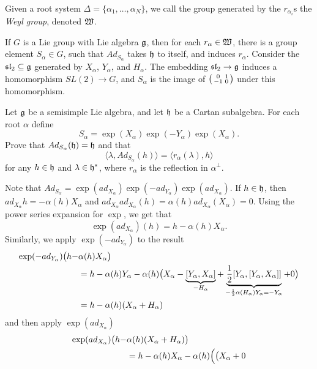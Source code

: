   Given a root system $\Delta =
 \{\alpha_1,\dots, \alpha_N\}$, we call the group generated by the $r_{\alpha_i}$s the
 \emph{Weyl group}, denoted $\mathfrak{W}$.

 \begin{remark}
   If $G$ is a Lie group with Lie algebra $\mathfrak{g}$, then for each $r_\alpha\in \mathfrak{W}$, there
   is a group element $S_\alpha\in G$, such that $Ad_{S_\alpha}$ takes $\mathfrak{h}$ to itself,
   and induces $r_\alpha$. Consider the $\mathfrak{sl}_2\subseteq \mathfrak{g}$ generated
   by $X_\alpha$, $Y_\alpha$, and $H_\alpha$. The embedding $\mathfrak{sl}_2\to \mathfrak{g}$ induces a
   homomorphism $SL(2)\to G$, and $S_\alpha$ is the image of $\left( \begin{smallmatrix} 0 & 1 \\ -1 & 0 \end{smallmatrix} \right)$ under
   this homomorphism.
 \end{remark}
 \begin{exercise}\label{lec14Ex:Weyl}
   Let $\mathfrak{g}$ be a semisimple Lie algebra, and let $\mathfrak{h}$ be a Cartan subalgebra. For each
   root $\alpha$ define
   \[
    S_\alpha = \exp(X_\alpha)\exp(-Y_\alpha)\exp(X_\alpha).
   \]
   Prove that $Ad_{S_\alpha}(\mathfrak{h})=\mathfrak{h}$ and that
   \[
    \langle \lambda, Ad_{S_\alpha}(h)\rangle = \langle r_\alpha(\lambda),h\rangle
   \]
   for any $h\in \mathfrak{h}$ and $\lambda\in \mathfrak{h}^*$, where $r_\alpha$ is the reflection in
   $\alpha^\perp$.
   \begin{solution} \label{lec14Soln:Weyl}
     Note that
     $Ad_{S_\alpha}=\exp(ad_{X_\alpha})\exp(-ad_{Y_\alpha})\exp(ad_{X_\alpha})$. If
     $h\in \mathfrak{h}$, then $ad_{X_\alpha}h=-\alpha(h)X_\alpha$ and
     $ad_{X_\alpha}ad_{X_\alpha}(h)=\alpha(h)ad_{X_\alpha}(X_\alpha)=0$. Using the
     power series expansion for $\exp$, we get that
     \[
       \exp(ad_{X_\alpha})(h)=h - \alpha(h)X_\alpha.
     \]
     Similarly, we apply $\exp(-ad_{Y_\alpha})$ to the result
     \begin{align*}
       \exp(-ad_{Y_\alpha})\bigl(h-&\alpha(h)X_\alpha\bigr) \\
        &= h-\alpha(h)Y_\alpha -
       \alpha(h)\bigl( X_\alpha -\underbrace{[Y_\alpha,X_\alpha]}_{-H_\alpha} +
       \underbrace{\frac{1}{2}[Y_\alpha,[Y_\alpha,X_\alpha]]}_{-\frac{1}{2}\alpha(H_\alpha)Y_\alpha=-Y_\alpha}
       + 0 \bigr)\\
       &= h - \alpha(h)(X_\alpha + H_\alpha)
     \end{align*}
     and then apply $\exp(ad_{X_\alpha})$
     \begin{align*}
       \exp(ad_{X_\alpha})\bigl(h-&\alpha(h)(X_\alpha+H_\alpha)\bigr)\\
           &= h-\alpha(h)X_\alpha - \alpha(h)\Bigl(\bigl( X_\alpha + 0

\end{align*}
\end{solution}
\end{exercise}
